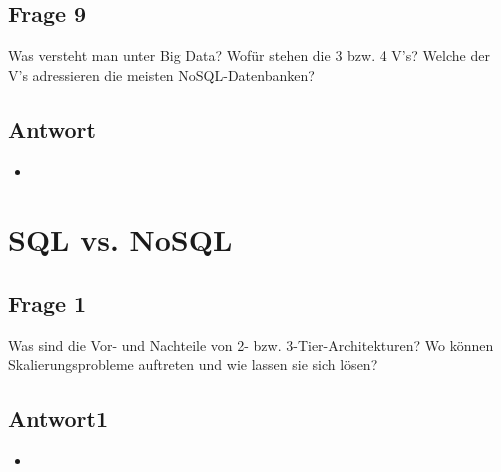 \subsection*{Frage 9}
Was versteht man unter Big Data? Wofür stehen die 3 bzw. 4 V's? Welche der V's adressieren die meisten NoSQL-Datenbanken?
\subsection*{Antwort}
\begin{itemize}
	\item 
\end{itemize}






\section*{SQL vs. NoSQL}
\subsection*{Frage 1}
Was sind die Vor- und Nachteile von 2- bzw. 3-Tier-Architekturen? Wo können Skalierungsprobleme auftreten und wie lassen sie sich lösen?
\subsection*{Antwort1}
\begin{itemize}
	\item 
\end{itemize}